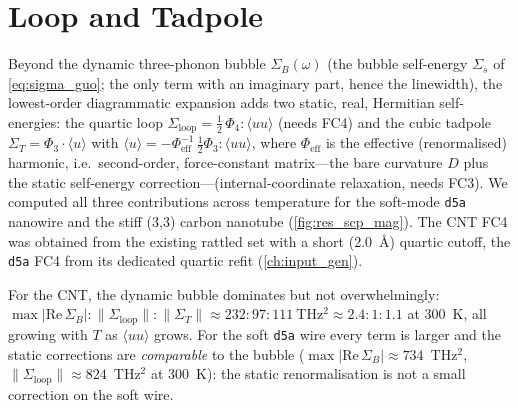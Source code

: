 \section{Loop and Tadpole}
\label{sec:res_scp}

Beyond the dynamic three-phonon bubble $\Sigma_B(\omega)$ (the bubble
self-energy $\Sigma_s$ of \cref{eq:sigma_guo}; the only term
with an imaginary part, hence the linewidth), the lowest-order diagrammatic expansion
adds two static, real, Hermitian self-energies: the quartic loop
$\Sigma_\mathrm{loop}=\tfrac12\,\Phi_4\!:\!\langle uu\rangle$ (needs FC4) and the cubic tadpole
$\Sigma_T=\Phi_3\!\cdot\!\langle u\rangle$ with
$\langle u\rangle=-\Phi_\mathrm{eff}^{-1}\,\tfrac12\Phi_3\!:\!\langle
uu\rangle$, where $\Phi_\mathrm{eff}$ is the effective (renormalised)
harmonic, i.e.\ second-order, force-constant matrix---the bare curvature
$D$ plus the static self-energy correction---(internal-coordinate
relaxation, needs FC3). We computed all
three contributions across temperature for the soft-mode
\texttt{d5a} nanowire and the stiff (3,3) carbon nanotube
(\cref{fig:res_scp_mag}). The CNT FC4 was obtained from the existing
rattled set with a short ($2.0$~\AA) quartic cutoff,
the \texttt{d5a} FC4 from its dedicated quartic refit
(\cref{ch:input_gen}).

For the CNT, the dynamic bubble dominates but not overwhelmingly:
$\max|\mathrm{Re}\,\Sigma_B|:\|\Sigma_\mathrm{loop}\|:\|\Sigma_T\|\approx
232:97:111~\mathrm{THz^2}\approx 2.4:1:1.1$
at $300$~K, all growing with $T$ as $\langle uu\rangle$ grows. For the
soft \texttt{d5a} wire every term is larger and the static corrections are
\emph{comparable} to the bubble ($\max|\mathrm{Re}\,\Sigma_B|\approx734$~THz$^2$,
$\|\Sigma_\mathrm{loop}\|\approx824$~THz$^2$ at $300$~K): the static
renormalisation is not a small correction on the soft wire.

